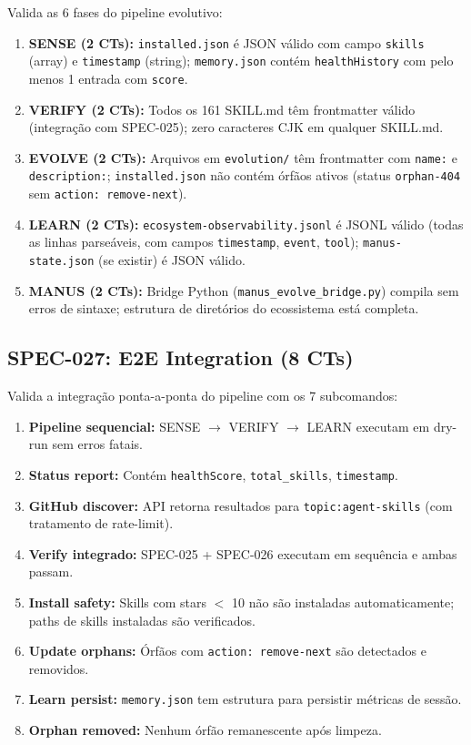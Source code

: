 Valida as 6 fases do pipeline evolutivo:

\begin{enumerate}
  \item \textbf{SENSE (2 CTs):} \texttt{installed.json} é JSON válido com campo \texttt{skills} (array) e \texttt{timestamp} (string); \texttt{memory.json} contém \texttt{healthHistory} com pelo menos 1 entrada com \texttt{score}.
  \item \textbf{VERIFY (2 CTs):} Todos os 161 SKILL.md têm frontmatter válido (integração com SPEC-025); zero caracteres CJK em qualquer SKILL.md.
  \item \textbf{EVOLVE (2 CTs):} Arquivos em \texttt{evolution/} têm frontmatter com \texttt{name:} e \texttt{description:}; \texttt{installed.json} não contém órfãos ativos (status \texttt{orphan-404} sem \texttt{action: remove-next}).
  \item \textbf{LEARN (2 CTs):} \texttt{ecosystem-observability.jsonl} é JSONL válido (todas as linhas parseáveis, com campos \texttt{timestamp}, \texttt{event}, \texttt{tool}); \texttt{manus-state.json} (se existir) é JSON válido.
  \item \textbf{MANUS (2 CTs):} Bridge Python (\texttt{manus\_evolve\_bridge.py}) compila sem erros de sintaxe; estrutura de diretórios do ecossistema está completa.
\end{enumerate}

\subsection{SPEC-027: E2E Integration (8 CTs)}

Valida a integração ponta-a-ponta do pipeline com os 7 subcomandos:

\begin{enumerate}
  \item \textbf{Pipeline sequencial:} SENSE $\rightarrow$ VERIFY $\rightarrow$ LEARN executam em dry-run sem erros fatais.
  \item \textbf{Status report:} Contém \texttt{healthScore}, \texttt{total\_skills}, \texttt{timestamp}.
  \item \textbf{GitHub discover:} API retorna resultados para \texttt{topic:agent-skills} (com tratamento de rate-limit).
  \item \textbf{Verify integrado:} SPEC-025 + SPEC-026 executam em sequência e ambas passam.
  \item \textbf{Install safety:} Skills com stars $<$ 10 não são instaladas automaticamente; paths de skills instaladas são verificados.
  \item \textbf{Update orphans:} Órfãos com \texttt{action: remove-next} são detectados e removidos.
  \item \textbf{Learn persist:} \texttt{memory.json} tem estrutura para persistir métricas de sessão.
  \item \textbf{Orphan removed:} Nenhum órfão remanescente após limpeza.
\end{enumerate}

